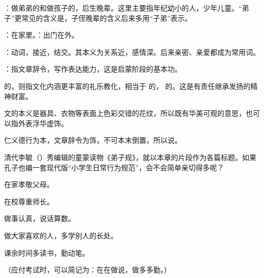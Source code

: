 {
\item {}：做弟弟的和做孩子的，后生晚辈。这里主要指年纪幼小的人，少年儿童。“弟子”更常见的含义是，子侄晚辈的含义后来多用“子弟”表示。
\item {}：在家里。：出门在外。
\item {}：动词，接近，结交。其本义为关系近，感情深。后来亲密、亲爱都成为常用词。
\item {}：指文章辞令，写作表达能力，这是启蒙阶段的基本功。

 的，则指文化内涵更丰富的礼乐教化，相当于  的， 的。这是有责任继承发扬的精神财富。

文的本义是器具、衣物等表面上色彩交错的花纹，所以既有华美可观的意思，也可以指外表浮华虚饰。

仁义德行为本，文章辞令为饰，不可本末倒置，所以说。
}
{
清代李毓（）秀编辑的童蒙读物《弟子规》，就以本章的片段作为各篇标题。如果孔子也编一套现代版“小学生日常行为规范”，会不会简单亲切得多呢？
\begin{lyenumerate}
\item 在家孝敬父母。
\item 在校尊重师长。%
\item 做事认真，说话算数。
\item 做大家喜欢的人，多学别人的长处。
\item 课余时间多读书，勤动笔。
\end{lyenumerate}
（应付考试时，可以简记为：在在做说，做多多勤。）
}


